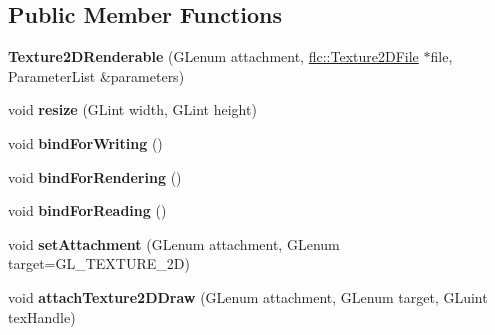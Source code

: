 \subsection*{Public Member Functions}
\begin{DoxyCompactItemize}
\item 
\mbox{\label{classflw_1_1flc_1_1Texture2DRenderable_afcb0b361ecb1864667fd45082874a0f5}} 
{\bfseries Texture2\+D\+Renderable} (G\+Lenum attachment, \hyperlink{classflw_1_1flc_1_1Texture2DFile}{flc\+::\+Texture2\+D\+File} $\ast$file, Parameter\+List \&parameters)
\item 
\mbox{\label{classflw_1_1flc_1_1Texture2DRenderable_aebcd2fea21b574145f4c415dd35ae168}} 
void {\bfseries resize} (G\+Lint width, G\+Lint height)
\item 
\mbox{\label{classflw_1_1flc_1_1Texture2DRenderable_aecee11c1f1089b57b1b795645c3017e4}} 
void {\bfseries bind\+For\+Writing} ()
\item 
\mbox{\label{classflw_1_1flc_1_1Texture2DRenderable_abc96dcdc0a74ec89a5d7651f90ae8a0d}} 
void {\bfseries bind\+For\+Rendering} ()
\item 
\mbox{\label{classflw_1_1flc_1_1Texture2DRenderable_af6e7b50ce2f60f9678c03946f6a2db21}} 
void {\bfseries bind\+For\+Reading} ()
\item 
\mbox{\label{classflw_1_1flc_1_1Texture2DRenderable_a15077132aaaa9b98b55f9d581ad3ba11}} 
void {\bfseries set\+Attachment} (G\+Lenum attachment, G\+Lenum target=G\+L\+\_\+\+T\+E\+X\+T\+U\+R\+E\+\_\+2D)
\item 
\mbox{\label{classflw_1_1flc_1_1Texture2DRenderable_a0f73aa013a48c510dffbf12eef80aca8}} 
void {\bfseries attach\+Texture2\+D\+Draw} (G\+Lenum attachment, G\+Lenum target, G\+Luint tex\+Handle)
\item 
\mbox{\label{classflw_1_1flc_1_1Texture2DRenderable_a4da4b2f4af5bc86a4a9aa58a64443b6e}} 

\end{DoxyCompactItemize}
